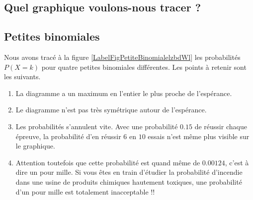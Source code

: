 \subsection{Quel graphique voulons-nous tracer ?}

\subsection{Petites binomiales}

\newcommand{\CaptionFigPetiteBinomialelzbdWl}{Les probablités \( P(X=k)\) pour certaines petites binomiales.}


Nous avons tracé à la figure \ref{LabelFigPetiteBinomialelzbdWl} les probabilités \( P(X=k)\) pour quatre petites binomiales différentes. Les points à retenir sont les suivants.
\begin{enumerate}
    \item
        La diagramme a un maximum en l'entier le plus proche de l'espérance.
    \item
        Le diagramme n'est pas très symétrique autour de l'espérance.
    \item
        Les probabilités s'annulent vite. Avec une probabilité \( 0.15\) de réussir chaque épreuve, la probabilité d'en réussir \( 6\) en \( 10\) essais n'est même plus visible sur le graphique.
    \item
        Attention toutefois que cette probabilité est quand même de \( 0.00124\), c'est à dire un pour mille. Si vous êtes en train d'étudier la probabilité d'incendie dans une usine de produits chimiques hautement toxiques, une probabilité d'un pour mille est totalement inacceptable !!
\end{enumerate}


